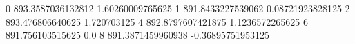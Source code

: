0 893.3587036132812 1.60260009765625
1 891.8433227539062 0.08721923828125
2 893.476806640625 1.720703125
4 892.8797607421875 1.1236572265625
6 891.756103515625 0.0
8 891.3871459960938 -0.36895751953125
